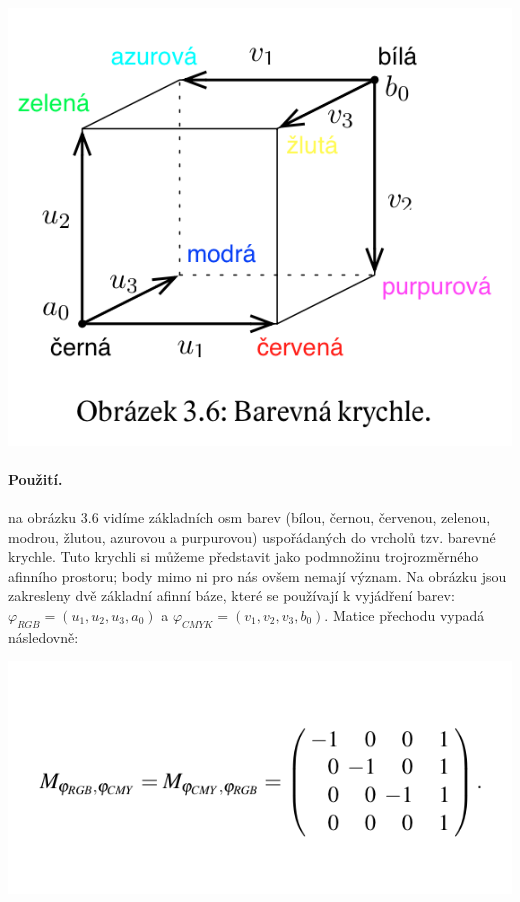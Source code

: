 \documentclass[12pt,a4paper]{article}
\begin{document}
\begin{center}
	\includegraphics[scale=0.4]{img/KrychleBarevnychModelu}
\end{center}


\paragraph{Použití.} na obrázku 3.6 vidíme základních osm barev (bílou, černou, červenou, zelenou, modrou, žlutou, azurovou a purpurovou) uspořádaných do vrcholů tzv. barevné krychle. Tuto krychli si můžeme představit jako podmnožinu trojrozměrného afinního prostoru; body mimo ni pro nás ovšem nemají význam. Na obrázku jsou zakresleny dvě základní afinní báze, které se používají k vyjádření barev: $\varphi_{RGB} = (u_1,u_2,u_3,a_0)$ a  $\varphi_{CMYK} = (v_1,v_2,v_3,b_0)$. Matice přechodu vypadá následovně:
\begin{center}
	\includegraphics[scale=0.6]{img/MaticePrechoduRGB_CMYK}
\end{center}
\end{document}
